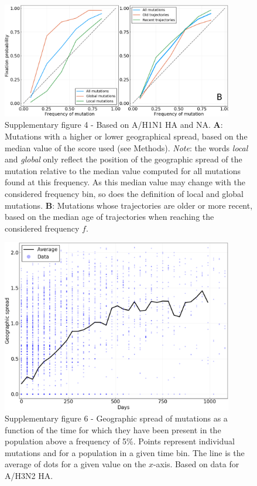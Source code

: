 \documentclass[reprint,amsmath,amssymb,superscriptaddress,showpacs,pre]{revtex4-1}
\begin{document}
	\begin{figure}
		\centering
		\includegraphics[width=0.9\textwidth]{SM_figures/geospread_and_time_h1n1pdm.png}
		\caption{Supplementary figure 4 - Based on A/H1N1 HA and NA. \textbf{A}: Mutations with a higher or lower geographical spread, based on the median value of the score used (see Methods). \emph{Note}: the words \emph{local} and \emph{global} only reflect the position of the geographic spread of the mutation relative to the median value computed for all mutations found at this frequency. As this median value may change with the considered frequency bin, so does the definition of local and global mutations. \textbf{B}: Mutations whose trajectories are older or more recent, based on the median age of trajectories when reaching the considered frequency $f$.}
		\label{fig:geospread_and_time_h1n1pdm}
	\end{figure}


	\begin{figure}
		\centering
		\includegraphics[width=0.9\textwidth]{SM_figures/GeoSpread_v_time_ha.png}
		\caption{Supplementary figure 6 - Geographic spread of mutations as a function of the time for which they have been present in the population above a frequency of 5\%. Points represent individual mutations and for a population in a given time bin. The line is the average of dots for a given value on the $x$-axis. Based on data for A/H3N2 HA.}
		\label{fig:geospread_v_time}
	\end{figure}
\end{document}
